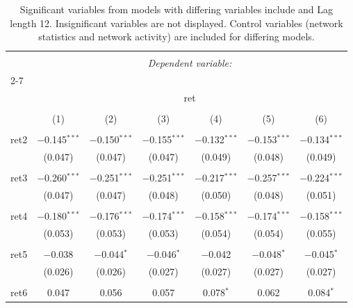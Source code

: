 
\begin{table}[!htbp] \centering 
  \caption{Significant variables from models with differing variables include 
                               and Lag length 12. Insignificant variables are not displayed. 
                               Control variables (network statistics and network activity) are 
                               included for differing models.} 
  \label{Returnmodels1_5min_t} 
\scriptsize 
\begin{tabular}{@{\extracolsep{5pt}}lcccccc} 
\\[-1.8ex]\hline 
\hline \\[-1.8ex] 
 & \multicolumn{6}{c}{\textit{Dependent variable:}} \\ 
\cline{2-7} 
\\[-1.8ex] & \multicolumn{6}{c}{ret} \\ 
\\[-1.8ex] & (1) & (2) & (3) & (4) & (5) & (6)\\ 
\hline \\[-1.8ex] 
 ret2 & $-$0.145$^{***}$ & $-$0.150$^{***}$ & $-$0.155$^{***}$ & $-$0.132$^{***}$ & $-$0.153$^{***}$ & $-$0.134$^{***}$ \\ 
  & (0.047) & (0.047) & (0.047) & (0.049) & (0.048) & (0.049) \\ 
  & & & & & & \\ 
 ret3 & $-$0.260$^{***}$ & $-$0.251$^{***}$ & $-$0.251$^{***}$ & $-$0.217$^{***}$ & $-$0.257$^{***}$ & $-$0.224$^{***}$ \\ 
  & (0.047) & (0.047) & (0.048) & (0.050) & (0.048) & (0.051) \\ 
  & & & & & & \\ 
 ret4 & $-$0.180$^{***}$ & $-$0.176$^{***}$ & $-$0.174$^{***}$ & $-$0.158$^{***}$ & $-$0.174$^{***}$ & $-$0.158$^{***}$ \\ 
  & (0.053) & (0.053) & (0.053) & (0.054) & (0.054) & (0.055) \\ 
  & & & & & & \\ 
 ret5 & $-$0.038 & $-$0.044$^{*}$ & $-$0.046$^{*}$ & $-$0.042 & $-$0.048$^{*}$ & $-$0.045$^{*}$ \\ 
  & (0.026) & (0.026) & (0.027) & (0.027) & (0.027) & (0.027) \\ 
  & & & & & & \\ 
 ret6 & 0.047 & 0.056 & 0.057 & 0.078$^{*}$ & 0.062 & 0.084$^{*}$ \\ 

\end{tabular}
\end{table}
